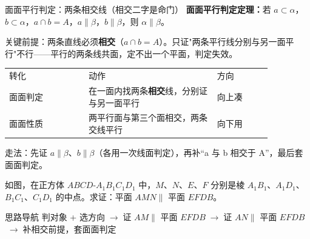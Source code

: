 \documentclass{exam-zh}
\begin{document}
\clearpage
{}


\begin{eduSolutionBox}{面面平行判定：两条相交线（相交二字是命门）}
  \begingroup
  \setlength{\parskip}{2.5mm}
\textbf{面面平行判定定理：}若 $a\subset\alpha$，$b\subset\alpha$，$a\cap b=A$，$a\parallel\beta$，$b\parallel\beta$，则 $\alpha\parallel\beta$。\par
关键前提：两条直线必须\textbf{相交}（$a\cap b=A$）。只证"两条平行线分别与另一面平行"不行——平行的两条线共面，定不出一个平面，判定失效。\par
\begin{tabular}{p{0.26\linewidth}p{0.42\linewidth}p{0.18\linewidth}}
转化 & 动作 & 方向\\
面面判定 & 在一面内找两条\textbf{相交}线，分别证与另一面平行 & 向上凑\\
面面性质 & 两平行面与第三个面相交，两条交线平行 & 向下用\\
\end{tabular}
\par
走法：先证 $a\parallel\beta$、$b\parallel\beta$（各用一次线面判定），再补“a 与 b 相交于 A”，最后套面面判定。\par
  \endgroup
\end{eduSolutionBox}




\begin{eduProblemBlock}[例题 3]
\noindent
\begin{minipage}[t]{\dimexpr\linewidth-70mm-6mm\relax}
\vspace{0pt}
如图，在正方体 $ABCD$-$A_{1}B_{1}C_{1}D_{1}$ 中，$M$、$N$、$E$、$F$ 分别是棱 $A_{1}B_{1}$、$A_{1}D_{1}$、$B_{1}C_{1}$、$C_{1}D_{1}$ 的中点。求证：平面 $AMN\parallel$ 平面 $EFDB$。

\end{minipage}\hfill
\begin{diagramcoltikz}{70mm}{正方体上底面四个中点，先想哪两条相交线分别与另一面平行。}
}
\end{diagramcoltikz}
\end{eduProblemBlock}





\begin{eduAuxItem}{思路导航}
判对象 + 选方向$\;\to\;$证 $AM\parallel$ 平面 $EFDB$$\;\to\;$证 $AN\parallel$ 平面 $EFDB$$\;\to\;$补相交前提，套面面判定\end{eduAuxItem}
\end{document}

